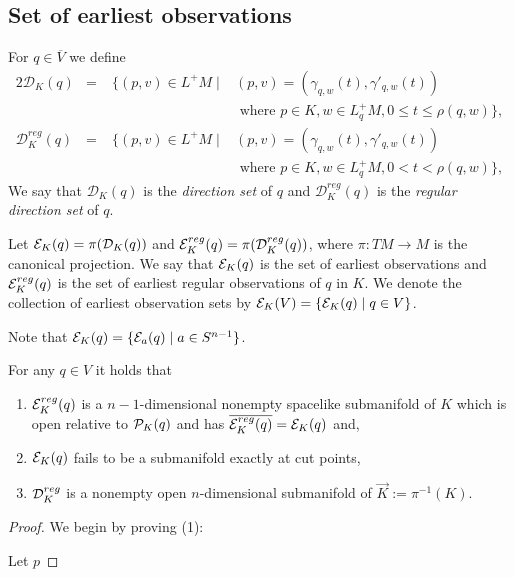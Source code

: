 \subsection{Set of earliest observations}
\begin{definition}
For $q\in \overline{V}$ we define
\begin{alignat*}{2}
    \mathcal{D}_K(q) &=\; &\{(p,v)\in L^+M \mid &(p,v) = (\gamma_{q,w}(t),\gamma'_{q,w}(t)) \\
    &&&\text{ where } p\in K, w\in L_q^+M, 0\leq t \leq \rho(q,w)\},\\
    \mathcal{D}^{reg}_K(q) &=\; &\{(p,v)\in L^+M \mid &(p,v) = (\gamma_{q,w}(t),\gamma'_{q,w}(t)) \\
    &&&\text{ where } p\in K, w\in L_q^+M, 0 < t < \rho(q,w)\},
\end{alignat*}
We say that $\mathcal{D}_K(q)$ is the \emph{direction set} of $q$ and $\mathcal{D}^{reg}_K(q)$ is the \emph{regular direction set} of $q$.

Let $\mathcal{E}_K(q) = \pi(\mathcal{D}_K(q))$ and $\mathcal{E}^{reg}_K(q) = \pi(\mathcal{D}^{reg}_K(q))$, where $\pi:TM\to M$ is the canonical projection. We say that $\mathcal{E}_K(q)$ is the set of earliest observations and $\mathcal{E}^{reg}_K(q)$ is the set of earliest regular observations of $q$ in $K$. We denote the collection of earliest observation sets by $\mathcal{E}_K(V) = \{ \mathcal{E}_K(q) \mid q\in V\}$.
\end{definition}

Note that $\mathcal{E}_K(q) = \{ \mathcal{E}_a(q) \mid a\in S^{n-1} \}$.
\begin{proposition}\label{prop:submanifolds}
For any $q\in V$ it holds that
\begin{enumerate}[label={\textnormal{(\arabic*)}}]
    \item $\mathcal{E}^{reg}_K(q)$ is a $n-1$-dimensional nonempty spacelike submanifold of $K$ which is open relative to $\mathcal{P}_K(q)$ and has $\overline{\mathcal{E}^{reg}_K(q)} = \mathcal{E}_K(q)$ and,
    \item $\mathcal{E}_K(q)$ fails to be a submanifold exactly at cut points,
    \item $\mathcal{D}^{reg}_K$ is a nonempty open $n$-dimensional submanifold of $\overrightarrow{K}:=\pi^{-1}(K)$.
\end{enumerate}
\end{proposition}
\begin{proof}
We begin by proving (1):

Let $p$

\end{proof}

